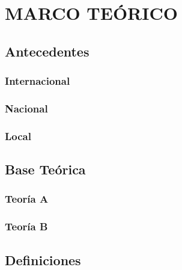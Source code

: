 \chapter{MARCO TEÓRICO}
    \lipsum[2 - 6]
	\section{Antecedentes}
	    \lipsum[2]
		\subsection{Internacional}
		\lipsum[1]
		\subsection{Nacional}
		\lipsum[2]
		\subsection{Local}
		\lipsum[3]
	\section{Base Teórica}
		\subsection{Teoría A}
		\lipsum[5]
		\subsection{Teoría B}
		\lipsum[5]
	\section{Definiciones}
	\lipsum[6]
		
	